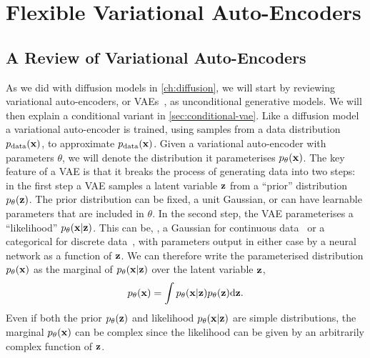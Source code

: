 \chapter{Flexible Variational Auto-Encoders}

\section{A Review of Variational Auto-Encoders}
\label{sec:vae}
As we did with diffusion models in \cref{ch:diffusion}, we will start by reviewing variational auto-encoders, or VAEs~\citep{kingma2013auto,rezende2014stochastic}, as unconditional generative models. We will then explain a conditional variant in \cref{sec:conditional-vae}. Like a diffusion model a variational auto-encoder is trained, using samples from a data distribution $p_{\rm{data}}({\mathbf{x}})$, to approximate $p_{\rm{data}}({\mathbf{x}})$. Given a variational auto-encoder with parameters $\theta$, we will denote the distribution it parameterises $p_\theta({\mathbf{x}})$. The key feature of a VAE is that it breaks the process of generating data into two steps: in the first step a VAE samples a latent variable ${\mathbf{z}}$ from a ``prior'' distribution $p_\theta({\mathbf{z}})$. The prior distribution can be fixed, \eg a unit Gaussian, or can have learnable parameters that are included in $\theta$. In the second step, the VAE parameterises a ``likelihood'' $p_\theta({\mathbf{x}}|{\mathbf{z}})$. This can be, \eg, a Gaussian for continuous data~\citep{kingma2013auto} or a categorical for discrete data~\citep{child2020very}, with parameters output in either case by a neural network as a function of ${\mathbf{z}}$. We can therefore write the parameterised distribution $p_\theta({\mathbf{x}})$ as the marginal of $p_\theta({\mathbf{x}}|{\mathbf{z}})$ over the latent variable ${\mathbf{z}}$,
\begin{equation} \label{eq:vae-marginal}
p_\theta({\mathbf{x}}) = \int p_\theta({\mathbf{x}}|{\mathbf{z}})p_\theta({\mathbf{z}}) \mathrm{d}{\mathbf{z}}.
\end{equation}
Even if both the prior $p_\theta({\mathbf{z}})$ and likelihood $p_\theta({\mathbf{x}}|{\mathbf{z}})$ are simple distributions, the marginal $p_\theta({\mathbf{x}})$ can be complex since the likelihood can be given by an arbitrarily complex function of ${\mathbf{z}}$.

